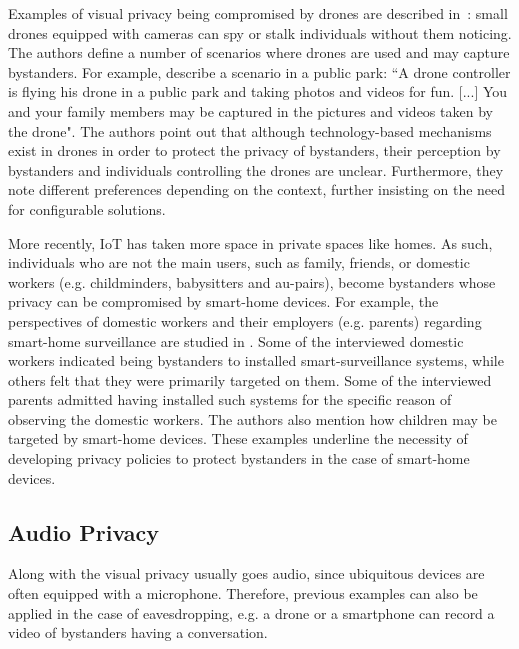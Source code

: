 \documentclass[conference]{IEEEtran}
\begin{document}
Examples of visual privacy being compromised by drones are described in~\cite{yao2017privacy}: small drones equipped with cameras can spy or stalk individuals without them noticing. The authors define a number of scenarios where drones are used and may capture bystanders. For example, describe a scenario in a public park: ``A drone controller is flying his drone in a public park and taking photos and videos for fun. [...] You and your family members may be captured in the pictures and videos taken by the drone". The authors point out that although technology-based mechanisms exist in drones in order to protect the privacy of bystanders, their perception by bystanders and individuals controlling the drones are unclear. Furthermore, they note different preferences depending on the context, further insisting on the need for configurable solutions.

More recently, \ac{IoT} has taken more space in private spaces like homes. As such, individuals who are not the main users, such as family, friends, or domestic workers (e.g. childminders, babysitters and au-pairs), become bystanders whose privacy can be compromised by smart-home devices. For example, the perspectives of domestic workers and their employers (e.g. parents) regarding smart-home surveillance are studied in \cite{bernd2020bystanders}. Some of the interviewed domestic workers indicated being bystanders to installed smart-surveillance systems, while others felt that they were primarily targeted on them. Some of the interviewed parents admitted having installed such systems for the specific reason of observing the domestic workers. The authors also mention how children may be targeted by smart-home devices. These examples underline the necessity of developing privacy policies to protect bystanders in the case of smart-home devices.

\subsection{Audio Privacy}\label{Audio}
Along with the visual privacy usually goes audio, since ubiquitous devices are often equipped with a microphone. Therefore, previous examples can also be applied in the case of eavesdropping, e.g. a drone or a smartphone can record a video of bystanders having a conversation. 
\end{document}

